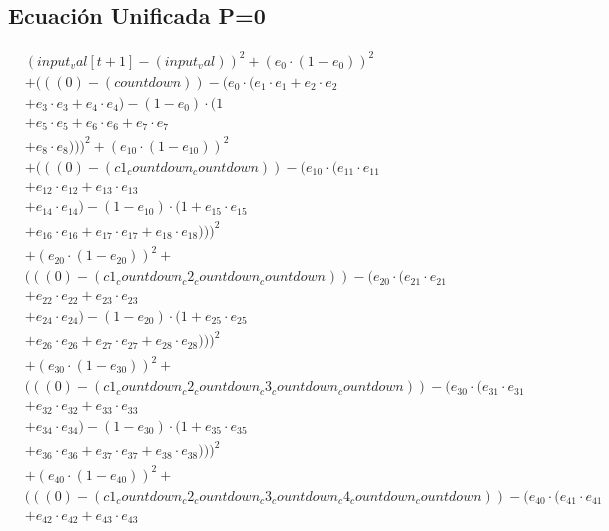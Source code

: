 \documentclass[10pt, a4paper]{article}
\begin{document}
\subsection*{Ecuación Unificada P=0}
\begin{align*}
& (input_val[t+1] - (input_val))^{2} + (e_{0} \cdot (1 - e_{0}))^{2} \\
& + (((0) - (countdown)) - (e_{0} \cdot (e_{1} \cdot e_{1} + e_{2} \cdot e_{2} \\
& + e_{3} \cdot e_{3} + e_{4} \cdot e_{4}) - (1 - e_{0}) \cdot (1 \\
& + e_{5} \cdot e_{5} + e_{6} \cdot e_{6} + e_{7} \cdot e_{7} \\
& + e_{8} \cdot e_{8})))^{2} + (e_{10} \cdot (1 - e_{10}))^{2} \\
& + (((0) - (c1_countdown_countdown)) - (e_{10} \cdot (e_{11} \cdot e_{11} \\
& + e_{12} \cdot e_{12} + e_{13} \cdot e_{13} \\
& + e_{14} \cdot e_{14}) - (1 - e_{10}) \cdot (1 + e_{15} \cdot e_{15} \\
& + e_{16} \cdot e_{16} + e_{17} \cdot e_{17} + e_{18} \cdot e_{18})))^{2} \\
& + (e_{20} \cdot (1 - e_{20}))^{2} + \\
& (((0) - (c1_countdown_c2_countdown_countdown)) - (e_{20} \cdot (e_{21} \cdot e_{21} \\
& + e_{22} \cdot e_{22} + e_{23} \cdot e_{23} \\
& + e_{24} \cdot e_{24}) - (1 - e_{20}) \cdot (1 + e_{25} \cdot e_{25} \\
& + e_{26} \cdot e_{26} + e_{27} \cdot e_{27} + e_{28} \cdot e_{28})))^{2} \\
& + (e_{30} \cdot (1 - e_{30}))^{2} + \\
& (((0) - (c1_countdown_c2_countdown_c3_countdown_countdown)) - (e_{30} \cdot (e_{31} \cdot e_{31} \\
& + e_{32} \cdot e_{32} + e_{33} \cdot e_{33} \\
& + e_{34} \cdot e_{34}) - (1 - e_{30}) \cdot (1 + e_{35} \cdot e_{35} \\
& + e_{36} \cdot e_{36} + e_{37} \cdot e_{37} + e_{38} \cdot e_{38})))^{2} \\
& + (e_{40} \cdot (1 - e_{40}))^{2} + \\
& (((0) - (c1_countdown_c2_countdown_c3_countdown_c4_countdown_countdown)) - (e_{40} \cdot (e_{41} \cdot e_{41} \\
& + e_{42} \cdot e_{42} + e_{43} \cdot e_{43} \\

\end{align*}
\end{document}
